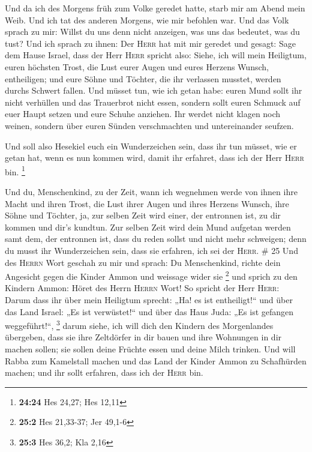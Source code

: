  Und da ich des Morgens früh zum Volke geredet hatte,
starb mir am Abend mein Weib. Und ich tat des anderen Morgens, wie mir
befohlen war.  Und das Volk sprach zu mir: Willst du uns
denn nicht anzeigen, was uns das bedeutet, was du tust? 
Und ich sprach zu ihnen: Der \textsc{Herr} hat mit mir geredet und
gesagt:  Sage dem Hause Israel, dass der Herr
\textsc{Herr} spricht also: Siehe, ich will mein Heiligtum, euren
höchsten Trost, die Lust eurer Augen und eures Herzens Wunsch,
entheiligen; und eure Söhne und Töchter, die ihr verlassen musstet,
werden durchs Schwert fallen.  Und müsset tun, wie ich
getan habe: euren Mund sollt ihr nicht verhüllen und das Trauerbrot
nicht essen,  sondern sollt euren Schmuck auf euer Haupt
setzen und eure Schuhe anziehen. Ihr werdet nicht klagen noch weinen,
sondern über euren Sünden verschmachten und untereinander seufzen.

 Und soll also Hesekiel euch ein Wunderzeichen sein, dass
ihr tun müsset, wie er getan hat, wenn es nun kommen wird, damit ihr
erfahret, dass ich der Herr \textsc{Herr} bin. \footnote{\textbf{24:24}
  Hes 24,27; Hes 12,11}

 Und du, Menschenkind, zu der Zeit, wann ich wegnehmen
werde von ihnen ihre Macht und ihren Trost, die Lust ihrer Augen und
ihres Herzens Wunsch, ihre Söhne und Töchter,  ja, zur
selben Zeit wird einer, der entronnen ist, zu dir kommen und dir's
kundtun.  Zur selben Zeit wird dein Mund aufgetan werden
samt dem, der entronnen ist, dass du reden sollst und nicht mehr
schweigen; denn du musst ihr Wunderzeichen sein, dass sie erfahren, ich
sei der \textsc{Herr}. \# 25  Und des \textsc{Herrn} Wort
geschah zu mir und sprach:  Du Menschenkind, richte dein
Angesicht gegen die Kinder Ammon und weissage wider sie \footnote{\textbf{25:2}
  Hes 21,33-37; Jer 49,1-6}  und sprich zu den Kindern
Ammon: Höret des Herrn \textsc{Herrn} Wort! So spricht der Herr
\textsc{Herr}: Darum dass ihr über mein Heiligtum sprecht: „Ha! es ist
entheiligt!{}`` und über das Land Israel: „Es ist verwüstet!{}`` und
über das Haus Juda: „Es ist gefangen weggeführt!{}``, \footnote{\textbf{25:3}
  Hes 36,2; Kla 2,16}  darum siehe, ich will dich den
Kindern des Morgenlandes übergeben, dass sie ihre Zeltdörfer in dir
bauen und ihre Wohnungen in dir machen sollen; sie sollen deine Früchte
essen und deine Milch trinken.  Und will Rabba zum
Kamelstall machen und das Land der Kinder Ammon zu Schafhürden machen;
und ihr sollt erfahren, dass ich der \textsc{Herr} bin.

